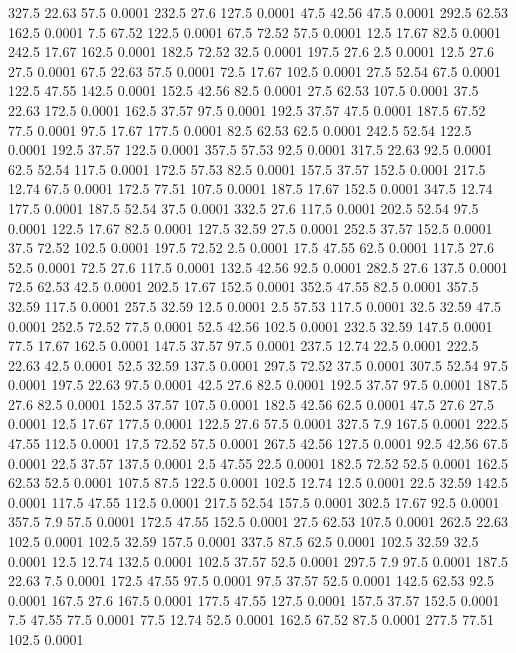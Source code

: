 327.5	22.63	57.5	0.0001
232.5	27.6	127.5	0.0001
47.5	42.56	47.5	0.0001
292.5	62.53	162.5	0.0001
7.5	67.52	122.5	0.0001
67.5	72.52	57.5	0.0001
12.5	17.67	82.5	0.0001
242.5	17.67	162.5	0.0001
182.5	72.52	32.5	0.0001
197.5	27.6	2.5	0.0001
12.5	27.6	27.5	0.0001
67.5	22.63	57.5	0.0001
72.5	17.67	102.5	0.0001
27.5	52.54	67.5	0.0001
122.5	47.55	142.5	0.0001
152.5	42.56	82.5	0.0001
27.5	62.53	107.5	0.0001
37.5	22.63	172.5	0.0001
162.5	37.57	97.5	0.0001
192.5	37.57	47.5	0.0001
187.5	67.52	77.5	0.0001
97.5	17.67	177.5	0.0001
82.5	62.53	62.5	0.0001
242.5	52.54	122.5	0.0001
192.5	37.57	122.5	0.0001
357.5	57.53	92.5	0.0001
317.5	22.63	92.5	0.0001
62.5	52.54	117.5	0.0001
172.5	57.53	82.5	0.0001
157.5	37.57	152.5	0.0001
217.5	12.74	67.5	0.0001
172.5	77.51	107.5	0.0001
187.5	17.67	152.5	0.0001
347.5	12.74	177.5	0.0001
187.5	52.54	37.5	0.0001
332.5	27.6	117.5	0.0001
202.5	52.54	97.5	0.0001
122.5	17.67	82.5	0.0001
127.5	32.59	27.5	0.0001
252.5	37.57	152.5	0.0001
37.5	72.52	102.5	0.0001
197.5	72.52	2.5	0.0001
17.5	47.55	62.5	0.0001
117.5	27.6	52.5	0.0001
72.5	27.6	117.5	0.0001
132.5	42.56	92.5	0.0001
282.5	27.6	137.5	0.0001
72.5	62.53	42.5	0.0001
202.5	17.67	152.5	0.0001
352.5	47.55	82.5	0.0001
357.5	32.59	117.5	0.0001
257.5	32.59	12.5	0.0001
2.5	57.53	117.5	0.0001
32.5	32.59	47.5	0.0001
252.5	72.52	77.5	0.0001
52.5	42.56	102.5	0.0001
232.5	32.59	147.5	0.0001
77.5	17.67	162.5	0.0001
147.5	37.57	97.5	0.0001
237.5	12.74	22.5	0.0001
222.5	22.63	42.5	0.0001
52.5	32.59	137.5	0.0001
297.5	72.52	37.5	0.0001
307.5	52.54	97.5	0.0001
197.5	22.63	97.5	0.0001
42.5	27.6	82.5	0.0001
192.5	37.57	97.5	0.0001
187.5	27.6	82.5	0.0001
152.5	37.57	107.5	0.0001
182.5	42.56	62.5	0.0001
47.5	27.6	27.5	0.0001
12.5	17.67	177.5	0.0001
122.5	27.6	57.5	0.0001
327.5	7.9	167.5	0.0001
222.5	47.55	112.5	0.0001
17.5	72.52	57.5	0.0001
267.5	42.56	127.5	0.0001
92.5	42.56	67.5	0.0001
22.5	37.57	137.5	0.0001
2.5	47.55	22.5	0.0001
182.5	72.52	52.5	0.0001
162.5	62.53	52.5	0.0001
107.5	87.5	122.5	0.0001
102.5	12.74	12.5	0.0001
22.5	32.59	142.5	0.0001
117.5	47.55	112.5	0.0001
217.5	52.54	157.5	0.0001
302.5	17.67	92.5	0.0001
357.5	7.9	57.5	0.0001
172.5	47.55	152.5	0.0001
27.5	62.53	107.5	0.0001
262.5	22.63	102.5	0.0001
102.5	32.59	157.5	0.0001
337.5	87.5	62.5	0.0001
102.5	32.59	32.5	0.0001
12.5	12.74	132.5	0.0001
102.5	37.57	52.5	0.0001
297.5	7.9	97.5	0.0001
187.5	22.63	7.5	0.0001
172.5	47.55	97.5	0.0001
97.5	37.57	52.5	0.0001
142.5	62.53	92.5	0.0001
167.5	27.6	167.5	0.0001
177.5	47.55	127.5	0.0001
157.5	37.57	152.5	0.0001
7.5	47.55	77.5	0.0001
77.5	12.74	52.5	0.0001
162.5	67.52	87.5	0.0001
277.5	77.51	102.5	0.0001
